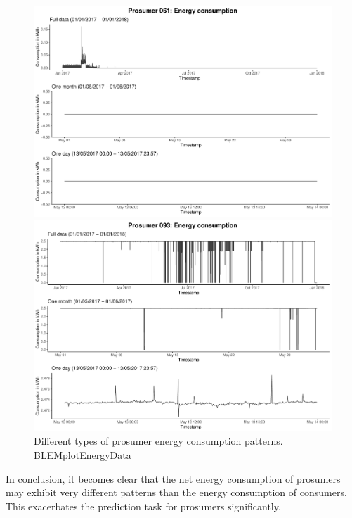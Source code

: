 \begin{figure}
    \begin{minipage}[h]{\dimexpr.5\textheight-0.15em}
    \includegraphics[width=\textwidth]{thesis/graphs/timeseries/p061_cons.pdf}
    \end{minipage}
    \begin{minipage}[h]{\dimexpr.5\textheight-0.15em}
    \includegraphics[width=\textwidth]{thesis/graphs/timeseries/p093_cons.pdf}
    \end{minipage}
    
    \caption[Different types of prosumer energy consumption patterns]{Different types of prosumer energy consumption patterns. \quantnet\href{ }{BLEMplotEnergyData}}
    \label{Fig:prosenergycons_peculiar}
\end{figure}

In conclusion, it becomes clear that the net energy consumption of prosumers may exhibit very different patterns than the energy consumption of consumers. This exacerbates the prediction task for prosumers significantly.

